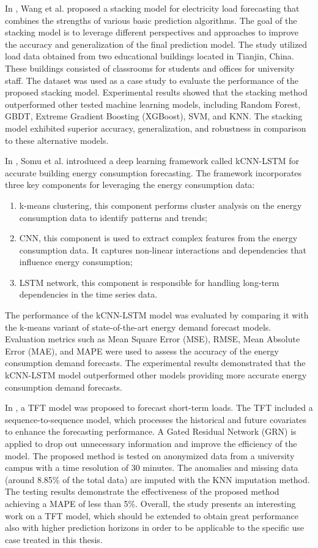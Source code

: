 In \cite{WANG2020114561}, Wang et al. proposed a stacking model for electricity load forecasting that combines the strengths of various basic prediction algorithms.
The goal of the stacking model is to leverage different perspectives and approaches to improve the accuracy and generalization of the final prediction model.
The study utilized load data obtained from two educational buildings located in Tianjin, China.
These buildings consisted of classrooms for students and offices for university staff.
The dataset was used as a case study to evaluate the performance of the proposed stacking model.
Experimental results showed that the stacking method outperformed other tested machine learning models, including Random Forest, GBDT, Extreme Gradient Boosting (XGBoost), SVM, and KNN.
The stacking model exhibited superior accuracy, generalization, and robustness in comparison to these alternative models.

In \cite{SOMU2021110591}, Somu et al. introduced a deep learning framework called kCNN-LSTM for accurate building energy consumption forecasting.
The framework incorporates three key components for leveraging the energy consumption data:
\begin{enumerate}
  \item k-means clustering, this component performs cluster analysis on the energy consumption data to identify patterns and trends;
  \item CNN, this component is used to extract complex features from the energy consumption data. It captures non-linear interactions and dependencies that influence energy consumption;
  \item LSTM network, this component is responsible for handling long-term dependencies in the time series data.
\end{enumerate}
The performance of the kCNN-LSTM model was evaluated by comparing it with the k-means variant of state-of-the-art energy demand forecast models.
Evaluation metrics such as Mean Square Error (MSE), RMSE, Mean Absolute Error (MAE), and MAPE were used to assess the accuracy of the energy consumption demand forecasts.
The experimental results demonstrated that the kCNN-LSTM model outperformed other models providing more accurate energy consumption demand forecasts.

In \cite{10033079}, a TFT model was proposed to forecast short-term loads.
The TFT included a sequence-to-sequence model, which processes the historical and future covariates to enhance the forecasting performance.
A Gated Residual Network (GRN) is applied to drop out unnecessary information and improve the efficiency of the model.
The proposed method is tested on anonymized data from a university campus with a time resolution of 30 minutes.
The anomalies and missing data (around 8.85\% of the total data) are imputed with the KNN imputation method.
The testing results demonstrate the effectiveness of the proposed method achieving a MAPE of less than 5\%.
Overall, the study presents an interesting work on a TFT model, which should be extended to obtain great performance also with higher prediction horizons in order to be applicable to the specific use case treated in this thesis.

